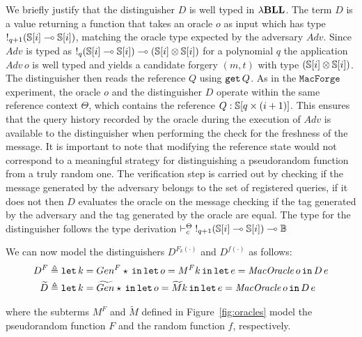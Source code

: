 We briefly justify that the distinguisher $D$ is well typed in ${\lambda}\mathbf{BLL}$. The term $D$ is a value returning a function that takes an oracle $o$ as input which has type $\mathord{!}_{q+1}(\mathbb{S}[i] \multimap \mathbb{S}[i])$, matching the oracle type expected by the adversary $Adv$. Since $Adv$ is typed as $\mathord{!}_{q}(\mathbb{S}[i] \multimap \mathbb{S}[i]) \multimap (\mathbb{S}[i] \otimes \mathbb{S}[i])$ for a polynomial $q$ the application $Adv\,o$ is well typed and yields a candidate forgery $(m,t)$ with type $(\mathbb{S}[i] \otimes \mathbb{S}[i])$. The distinguisher then reads the reference $Q$ using $\mathtt{get}\, Q$. As in the $\mathtt{MacForge}$ experiment, the oracle $o$ and the distinguisher $D$ operate within the same reference context $\Theta$, which contains the reference $Q : \mathbb{S}[q\times(i+1)]$. This ensures that the query history recorded by the oracle during the execution of $Adv$ is available to the distinguisher when performing the check for the freshness of the message. It is important to note that modifying the reference state would not correspond to a meaningful strategy for distinguishing a pseudorandom function from a truly random one. The verification step is carried out by checking if the message generated by the adversary belongs to the set of registered queries, if it does not then $D$ evaluates the oracle on the message checking if the tag generated by the adversary and the tag generated by the oracle are equal. The type for the distinguisher follows the type derivation $\vdash_c^\Theta \mathord{!}_{q+1}(\mathbb{S}[i] \multimap \mathbb{S}[i]) \multimap \mathbb{B}$

We can now model the distinguishers $D^{F_k(\cdot)}$ and $D^{f(\cdot)}$ as follows:
\begin{align}
D^F &\triangleq \mathtt{let}\,k=Gen^F \star\,\mathtt{in}\, \mathtt{let}\,o=M^F k\,\mathtt{in}\, \mathtt{let}\,e=\mathit{MacOracle}\,o\,\mathtt{in}\, D\,e \\  
\widetilde{D} &\triangleq \mathtt{let}\,k=\widetilde{Gen} \star\,\mathtt{in}\, \mathtt{let}\,o=\widetilde{M} k\,\mathtt{in}\, \mathtt{let}\,e=\mathit{MacOracle}\,o\,\mathtt{in}\, D\,e \label{eq:d-tilde}
\end{align}

where the subterms $M^F$ and $\widetilde{M}$ defined in Figure~\ref{fig:oracles} model the pseudorandom function $F$ and the random function $f$, respectively.

